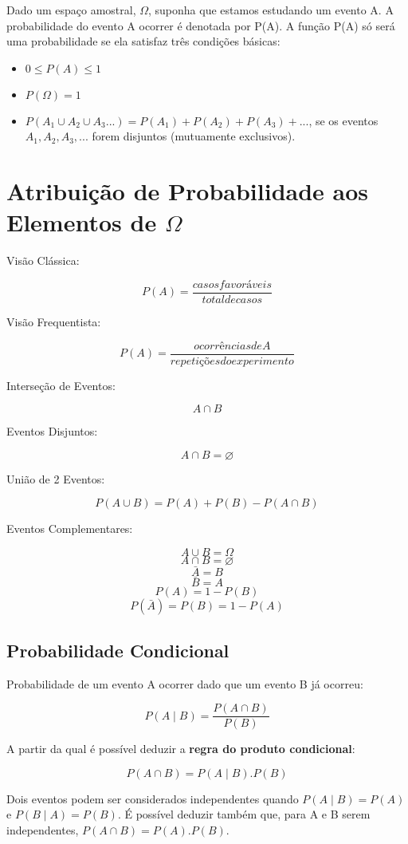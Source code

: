 Dado um espaço amostral, \(\Omega\), suponha que estamos estudando um evento A. A
probabilidade do evento A ocorrer é denotada por P(A). A função P(A) só será uma
probabilidade se ela satisfaz três condições básicas:
\begin{itemize}
	\item \( 0 \leq P(A) \leq 1 \)
	\item \( P(\Omega) = 1 \)
	\item \( P(A_1 \cup A_2 \cup A_3...) = P(A_1)+P(A_2)+P(A_3)+...\), se os eventos \(A_1, A_2, A_3, ...\) forem disjuntos (mutuamente exclusivos).
\end{itemize}

\section{Atribuição de Probabilidade aos Elementos de \( \Omega \)}

Visão Clássica:

\[ P(A) = \frac{casos favoráveis}{total de casos} \]

Visão Frequentista:

\[ P(A) = \frac{ocorrências de A}{repetições do experimento} \]

Interseção de Eventos: 

\[ A \cap B \]

Eventos Disjuntos: 

\[ A \cap B = \varnothing \]

União de 2 Eventos:

\[ P(A \cup B) = P(A) + P(B) - P(A \cap B) \]  

Eventos Complementares:

\[ A \cup B = \Omega \] 
\[ A \cap B = \varnothing \]
\[ \bar{A} = B \]
\[ \bar{B} = A \]
\[ P(A) = 1 - P(B) \]
\[ P(\bar{A}) = P(B) = 1 - P(A) \]

\subsection{Probabilidade Condicional}

Probabilidade de um evento A ocorrer dado que um evento B já ocorreu:

\[ P(A \mid B) = \frac{P(A \cap B)}{P(B)} \]

A partir da qual é possível deduzir a \textbf{regra do produto condicional}:

\[ P(A \cap B) = P(A \mid B).P(B) \]

Dois eventos podem ser considerados independentes quando \( P(A \mid B) = P(A) \) e \( P(B \mid A) = P(B) \). É possível deduzir também que, para A e B serem independentes, \( P(A \cap B) = P(A).P(B) \). 

